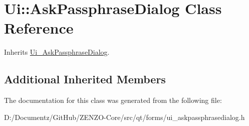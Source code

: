 \hypertarget{class_ui_1_1_ask_passphrase_dialog}{}\section{Ui\+::Ask\+Passphrase\+Dialog Class Reference}
\label{class_ui_1_1_ask_passphrase_dialog}


Inherits \mbox{\hyperlink{class_ui___ask_passphrase_dialog}{Ui\+\_\+\+Ask\+Passphrase\+Dialog}}.

\subsection*{Additional Inherited Members}


The documentation for this class was generated from the following file\+:\begin{DoxyCompactItemize}
\item 
D\+:/\+Documentz/\+Git\+Hub/\+Z\+E\+N\+Z\+O-\/\+Core/src/qt/forms/ui\+\_\+askpassphrasedialog.\+h\end{DoxyCompactItemize}
